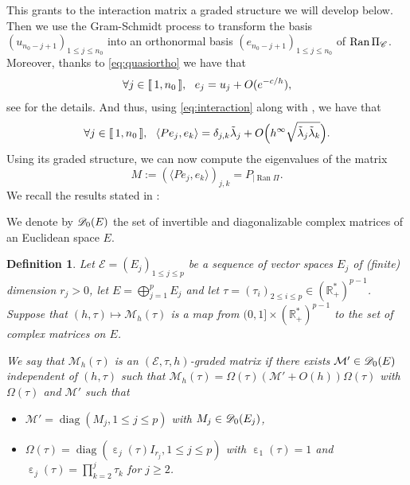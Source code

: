 \documentclass[12pt]{amsart}
\newcommand{\diag}{\operatorname{diag}}
\newcommand{\R}{\mathbb R}
\newcommand{\Ran}{\operatorname{Ran}}
\def\<{\langle}
\def\>{\rangle}
\numberwithin{equation}{section}
\numberwithin{figure}{section}
\DeclareMathOperator{\eps}{\varepsilon}
\newcommand{\lb}{\operatorname{[\negthinspace [}}
\newcommand{\rb}{\operatorname{]\negthinspace ]}}
\newtheorem{defin}{Definition}[section]
\def\mmm{{\mathcal M}}\def\nnn{{\mathcal N}} \def\ooo{{\mathcal O}}\def\ppp{{\mathcal P}}
\def\Er{{\mathscr E}}\def\Fr{{\mathscr F}}\def\Gr{{\mathscr G}}\def\Hr{{\mathscr H}}
\begin{document}
This %
grants to the interaction matrix a graded structure we will develop below. Then we use the Gram-Schmidt process to transform the basis $(u_{n_0-j+1})_{1\leq j\leq n_0}$ into an orthonormal basis $(e_{n_0-j+1})_{1\leq j\leq n_0}$ of $\Ran\Pi_\Cr$. Moreover, thanks to \eqref{eq:quasiortho} we have that
\begin{equation*}
\forall j\in\lb1,n_0\rb,\ \ e_j = u_j + O(e^{-c/h}),
\end{equation*}
see \cite[Lemma 4.11]{LePMi20} for the details. And thus, using \eqref{eq:interaction} along with \cite[Proposition 4.12]{LePMi20}, we have that
\begin{equation}\label{eq:Pee}
\forall j\in\lb1,n_0\rb,\ \ \<Pe_j,e_k\> = \delta_{j,k}\tilde{\lambda}_j + O\Big(h^\infty\sqrt{\tilde{\lambda}_j\tilde{\lambda}_k}\Big).
\end{equation}
Using its graded structure, we can now compute the eigenvalues of the matrix
\begin{equation}\label{eq:matrix}
M := (\<Pe_j,e_k\>)_{j,k} = {P}_{|\Ran\Pi}.
\end{equation}
We recall the results stated in \cite{LePMi20}:

We denote by ${\mathscr D}_0(E)$ the set of invertible and diagonalizable complex matrices of an Euclidean space $E$.

\begin{defin}\cite[Definition A.1]{LePMi20}
    Let $\Er = (E_j)_{1\leq j \leq p}$ be a sequence of vector spaces $E_j$ of (finite) dimension $r_j>0$, let $E = \bigoplus_{j=1}^pE_j$ and let $\tau = (\tau_i)_{2\leq i\leq p}\in(\R_+^*)^{p-1}$. Suppose that $(h,\tau)\mapsto \mmm_h(\tau)$ is a map from $(0,1]\times(\R_+^*)^{p-1}$ to the set of complex matrices on $E$.

    We say that $\mmm_h(\tau)$ is an $(\Er,\tau,h)$-graded matrix if there exists $\mmm'\in\Dr_0(E)$ independent of $(h,\tau)$ such that $\mmm_h(\tau) = \Omega(\tau)(\mmm' + O(h))\Omega(\tau)$ with $\Omega(\tau)$ and $\mmm'$ such that
    \begin{itemize}
        \item $\mmm' = \diag(M_j,1\leq j\leq p)$ with $M_j\in{\mathscr D}_0(E_j)$,
        \item $\Omega(\tau) = \diag(\eps_j(\tau)I_{r_j},1\leq j\leq p)$ with $\eps_1(\tau) = 1$ and $\eps_j(\tau) = \prod_{k=2}^j\tau_k$ for  $j\geq2$.
    \end{itemize}
\end{defin}
\end{document}
